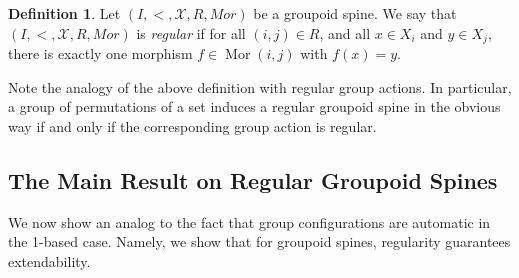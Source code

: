 \documentclass{amsart}
\theoremstyle{definition}
\newtheorem{definition}[theorem]{Definition}
\begin{document}
\begin{definition}
    Let $(I,<,\mathcal X,R,Mor)$ be a groupoid spine. We say that $(I,<,\mathcal X,R,Mor)$ is \textit{regular} if for all $(i,j)\in R$, and all $x\in X_i$ and $y\in X_j$, there is exactly one morphism $f\in\operatorname{Mor}(i,j)$ with $f(x)=y$.
\end{definition}

Note the analogy of the above definition with regular group actions. In particular, a group of permutations of a set induces a regular groupoid spine in the obvious way if and only if the corresponding group action is regular.

\subsection{The Main Result on Regular Groupoid Spines}

We now show an analog to the fact that group configurations are automatic in the 1-based case. Namely, we show that for groupoid spines, regularity guarantees extendability.
\end{document}
